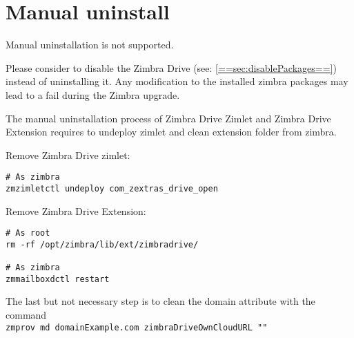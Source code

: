 \section{Manual uninstall}

\begin{warning}
    Manual uninstallation is not supported.

    Please consider to disable the Zimbra Drive (see: \ref{==sec:disablePackages==}) instead of uninstalling it.
    Any modification to the installed zimbra packages may lead to a fail during the Zimbra upgrade.
\end{warning}

The manual uninstallation process of Zimbra Drive Zimlet and Zimbra Drive Extension requires to undeploy zimlet and clean extension folder from zimbra.

Remove Zimbra Drive zimlet:
\begin{verbatim}
# As zimbra
zmzimletctl undeploy com_zextras_drive_open
\end{verbatim}
Remove Zimbra Drive Extension:
\begin{verbatim}
# As root
rm -rf /opt/zimbra/lib/ext/zimbradrive/

# As zimbra
zmmailboxdctl restart
\end{verbatim}
The last but not necessary step is to clean the domain attribute with the command\\
\texttt{zmprov md domainExample.com zimbraDriveOwnCloudURL ""}
